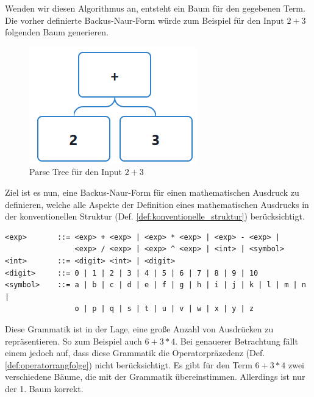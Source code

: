 \documentclass[11pt]{article}
\newcommand{\lab}[1]{(Def. \ref{#1})}
\begin{document}
Wenden wir diesen Algorithmus an, 
entsteht ein Baum für den gegebenen Term.
Die vorher definierte Backus-Naur-Form würde 
zum Beispiel für den Input $2+3$ folgenden Baum generieren.

\begin{figure}[h]
  \centering
  \includegraphics[scale=0.5]{trees/beispiel_bnf_1.png}
  \caption{Parse Tree für den Input $2+3$}
\end{figure}

Ziel ist es nun, eine Backus-Naur-Form für einen mathematischen Ausdruck 
zu definieren, welche alle Aspekte der Definition 
eines mathematischen Ausdrucks in der konventionellen Struktur 
\lab{def:konventionelle_struktur} berücksichtigt.

\begin{verbatim}
<exp>       ::= <exp> + <exp> | <exp> * <exp> | <exp> - <exp> | 
                <exp> / <exp> | <exp> ^ <exp> | <int> | <symbol>
<int>       ::= <digit> <int> | <digit>
<digit>     ::= 0 | 1 | 2 | 3 | 4 | 5 | 6 | 7 | 8 | 9 | 10
<symbol>    ::= a | b | c | d | e | f | g | h | i | j | k | l | m | n | 
                o | p | q | s | t | u | v | w | x | y | z
\end{verbatim}

Diese Grammatik ist in der Lage, eine große Anzahl von Ausdrücken zu repräsentieren. 
So zum Beispiel auch $6+3*4$. Bei genauerer Betrachtung fällt einem jedoch auf, 
dass diese Grammatik die Operatorpräzedenz \lab{def:operatorrangfolge} 
nicht berücksichtigt. 
Es gibt für den Term $6+3*4$ zwei verschiedene Bäume, 
die mit der Grammatik übereinstimmen. 
Allerdings ist nur der 1. Baum korrekt. 
\end{document}
